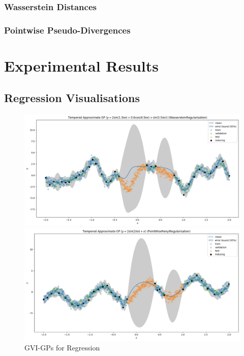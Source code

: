 \documentclass{article}
\numberwithin{equation}{section}
\begin{document}
\subsubsection{Wasserstein Distances}
\subsubsection{Pointwise Pseudo-Divergences}

\newpage
\section{Experimental Results}
\subsection{Regression Visualisations}
\begin{figure}[h!]
\centering
\begin{minipage}{.5\textwidth}
  \centering
  \includegraphics[width=0.9\linewidth]{experiments/regression/toy_curves/outputs/curve3/tempered-WassersteinRegularisation.png}
\end{minipage}%
\begin{minipage}{.5\textwidth}
  \centering
  \includegraphics[width=0.9\linewidth]{experiments/regression/toy_curves/outputs/curve4/tempered-PointWiseRenyiRegularisation.png}
\end{minipage}
\caption{GVI-GPs for Regression}
\end{figure}
\end{document}
